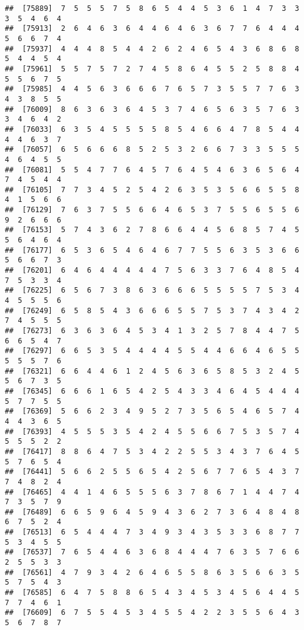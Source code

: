\documentclass[
]{book}
\begin{document}
\begin{verbatim}
##  [75889]  7  5  5  5  7  5  8  6  5  4  4  5  3  6  1  4  7  3  3  3  5  4  6  4
##  [75913]  2  6  4  6  3  6  4  4  6  4  6  3  6  7  7  6  4  4  4  5  6  6  7  4
##  [75937]  4  4  4  8  5  4  4  2  6  2  4  6  5  4  3  6  8  6  8  5  4  4  5  4
##  [75961]  5  5  7  5  7  2  7  4  5  8  6  4  5  5  2  5  8  8  4  5  5  6  7  5
##  [75985]  4  4  5  6  3  6  6  6  7  6  5  7  3  5  5  7  7  6  3  4  3  8  5  5
##  [76009]  8  6  3  6  3  6  4  5  3  7  4  6  5  6  3  5  7  6  3  3  4  6  4  2
##  [76033]  6  3  5  4  5  5  5  5  8  5  4  6  6  4  7  8  5  4  4  4  4  6  3  7
##  [76057]  6  5  6  6  6  8  5  2  5  3  2  6  6  7  3  3  5  5  5  4  6  4  5  5
##  [76081]  5  5  4  7  7  6  4  5  7  6  4  5  4  6  3  6  5  6  4  7  4  5  4  4
##  [76105]  7  7  3  4  5  2  5  4  2  6  3  5  3  5  6  6  5  5  8  4  1  5  6  6
##  [76129]  7  6  3  7  5  5  6  6  4  6  5  3  7  5  5  6  5  5  6  9  2  6  6  6
##  [76153]  5  7  4  3  6  2  7  8  6  6  4  4  5  6  8  5  7  4  5  5  6  4  6  4
##  [76177]  6  5  3  6  5  4  6  4  6  7  7  5  5  6  3  5  3  6  6  5  6  6  7  3
##  [76201]  6  4  6  4  4  4  4  4  7  5  6  3  3  7  6  4  8  5  4  7  5  3  3  4
##  [76225]  6  5  6  7  3  8  6  3  6  6  6  5  5  5  5  7  5  3  4  4  5  5  5  6
##  [76249]  6  5  8  5  4  3  6  6  6  5  5  7  5  3  7  4  3  4  2  7  4  5  5  5
##  [76273]  6  3  6  3  6  4  5  3  4  1  3  2  5  7  8  4  4  7  5  6  6  5  4  7
##  [76297]  6  6  5  3  5  4  4  4  4  5  5  4  4  6  6  4  6  5  5  5  5  5  7  6
##  [76321]  6  6  4  4  6  1  2  4  5  6  3  6  5  8  5  3  2  4  5  5  6  7  3  5
##  [76345]  6  6  6  1  6  5  4  2  5  4  3  3  4  6  4  5  4  4  4  5  7  7  5  5
##  [76369]  5  6  6  2  3  4  9  5  2  7  3  5  6  5  4  6  5  7  4  4  4  3  6  5
##  [76393]  4  5  5  5  3  5  4  2  4  5  5  6  6  7  5  3  5  7  4  5  5  5  2  2
##  [76417]  8  8  6  4  7  5  3  4  2  2  5  5  3  4  3  7  6  4  5  5  7  6  5  4
##  [76441]  5  6  6  2  5  5  6  5  4  2  5  6  7  7  6  5  4  3  7  7  4  8  2  4
##  [76465]  4  4  1  4  6  5  5  5  6  3  7  8  6  7  1  4  4  7  4  7  3  5  7  9
##  [76489]  6  6  5  9  6  4  5  9  4  3  6  2  7  3  6  4  8  4  8  6  7  5  2  4
##  [76513]  6  5  4  4  4  7  3  4  9  3  4  3  5  3  3  6  8  7  7  5  3  4  5  5
##  [76537]  7  6  5  4  4  6  3  6  8  4  4  4  7  6  3  5  7  6  6  2  5  5  3  3
##  [76561]  4  7  9  3  4  2  6  4  6  5  5  8  6  3  5  6  6  3  5  5  7  5  4  3
##  [76585]  6  4  7  5  8  8  6  5  4  3  4  5  3  4  5  6  4  4  5  7  7  4  6  1
##  [76609]  6  7  5  5  4  5  3  4  5  5  4  2  2  3  5  5  6  4  3  5  6  7  8  7

\end{verbatim}
\end{document}
